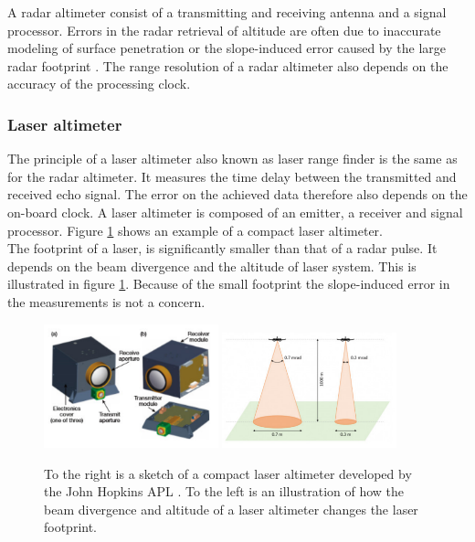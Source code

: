 A radar altimeter consist of a transmitting and receiving antenna and a signal processor. Errors in the radar retrieval of altitude are often due to inaccurate modeling of surface penetration or the slope-induced error caused by the large radar footprint \cite{icealti}. The range resolution of a radar altimeter also depends on the accuracy of the processing clock.

\subsubsection{Laser altimeter}

The principle of a laser altimeter also known as laser range finder is the same as for the radar altimeter. It measures the time delay between the transmitted and received echo signal. The error on the achieved data therefore also depends on the on-board clock. A laser altimeter is composed of an emitter, a receiver and signal processor. Figure \ref{alti} shows an example of a compact laser altimeter.\\

\noindent
The footprint of a laser, is significantly smaller than that of a radar pulse. It depends on the beam divergence and the altitude of laser system. This is illustrated in figure \ref{alti}. Because of the small footprint the slope-induced error in the measurements is not a concern.

\begin{figure}[htb]
\begin{center}
\includegraphics[width=0.45\textwidth]{figures/navtheory/CLA}
\includegraphics[width=0.45\textwidth]{figures/navtheory/lidarfoot}
\caption{To the right is a sketch of a compact laser altimeter developed by the John Hopkins APL \cite{APLCLA}. To the left is an illustration of how the beam divergence and altitude of a laser altimeter changes the laser footprint.\cite{footprint}}
\label{alti}
\end{center}
\end{figure}

